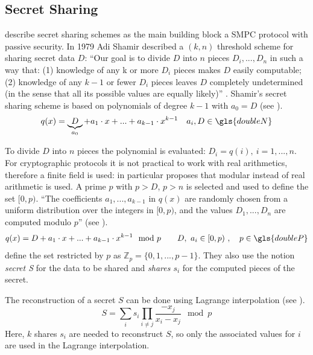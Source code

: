 \subsection{Secret Sharing}	\label{Secret Sharing}

\textcite[p. 32]{Cramer2015} describe secret sharing schemes as the main building block a \gls{SMPC} protocol with passive security. In 1979 Adi Shamir described a $(k, n)$ threshold scheme for sharing secret data $D$: ``Our goal is to divide $D$ into $n$ pieces $D_i,...,D_n$ in such a way that:
(1) knowledge of any k or more $D_i$ pieces makes $D$ easily computable; (2) knowledge of any $k-1$ or fewer $D_i$ pieces leaves $D$ completely undetermined (in the sense that all its possible values are equally likely)'' \autocite{Shamir1979}.
Shamir's secret sharing scheme is based on polynomials of degree $k-1$ with $a_0=D$ (see ). 
\begin{equation}
\label{eq:polynomial}
q(x)=\underbrace{D}_{a_0} + a_1 \cdot x + ... + a_{k-1} \cdot x^{k-1} \quad a_i, D \in \gls{doubleN}
\end{equation}

To divide $D$ into $n$ pieces the polynomial is evaluated: $D_i=q(i),\ i=1,...,n$. For cryptographic protocols it is not practical to work with real arithmetics, therefore a finite field is used: in particular \textcite{Shamir1979} proposes that modular instead of real arithmetic is used. A prime $p$ with $p>D$, $p>n$ is selected and used to define the set $[0, p)$. ``The coefficients $a_1, ..., a_{k-1}$ in $q(x)$ are randomly chosen from a uniform distribution over the integers in $[0, p)$, and the values $D_1, ..., D_n$ are computed modulo $p$'' \autocite[p. 613]{Shamir1979} (see ).
\begin{equation}
\label{eq:polynomial modular}
q(x) = D + a_1 \cdot x + ... + a_{k-1} \cdot x^{k-1} \mod p \qquad D,\ a_i \in [0,p)\ , \quad p \in \gls{doubleP}
\end{equation}
\textcite[p. 7]{Cramer2015} define the set restricted by $p$ as $\mathbb{Z}_p = \{0, 1, ..., p-1\}$. They also use the notion \textit{secret S} for the data to be shared and \textit{shares $s_i$} for the computed pieces of the secret.

The reconstruction of a secret $S$ can be done using Lagrange interpolation (see ).
\begin{equation}
\label{eq:SSS lagrange interpolation}
S = \sum_i s_i \prod_{i \neq j} \frac{-x_j}{x_i-x_j} \mod p
\end{equation}
Here, $k$ shares $s_i$ are needed to reconstruct $S$, so only the associated values for $i$ are used in the Lagrange interpolation.

